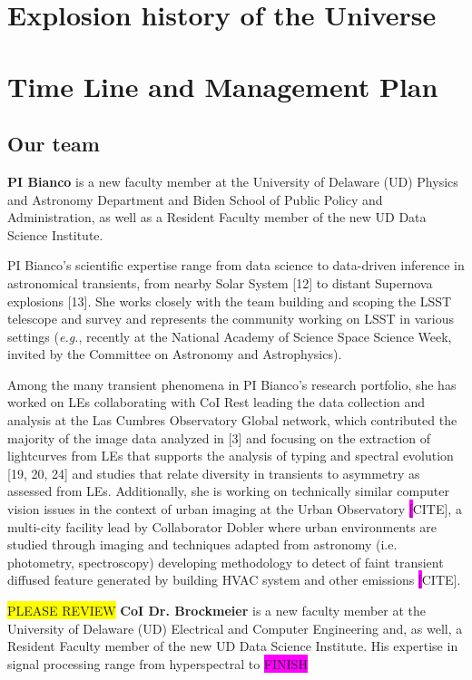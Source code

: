 \documentclass{proposalnsf}
\newcommand{\austin}[1]{\colorbox{yellow}{#1}}
\newcommand{\changeit}[1]{\colorbox{magenta}{#1}}
\newcommand{\eg}{\emph{e.g.}}
\begin{document}
\section {Explosion history of the Universe}


\section{Time Line and Management Plan}

\subsection{Our team}
{\bf PI Bianco} is a new faculty member at the University of Delaware (UD) Physics and Astronomy Department and Biden School of Public Policy and Administration,  as well as a Resident Faculty member of the new UD Data Science Institute.

PI Bianco’s scientific expertise range from data science to data-driven inference in astronomical transients, from nearby Solar System [12] to distant Supernova explosions [13].   She works closely with the team building and scoping the LSST telescope and survey and represents the community working on LSST in various settings (\eg,  recently at the National Academy of Science Space Science Week, invited by the Committee on Astronomy and Astrophysics).  

Among the many transient phenomena in PI Bianco’s research portfolio, she has worked on LEs collaborating with CoI Rest leading the data collection and analysis at the Las Cumbres Observatory Global network, which contributed the majority of the image data analyzed in [3] and focusing on the extraction of lightcurves from LEs that supports the analysis of typing and spectral evolution [19, 20, 24]
and studies that relate diversity in transients to asymmetry as assessed from LEs.  Additionally, she is working on technically similar computer vision issues in the context of urban imaging at the Urban Observatory \changeit[CITE], a multi-city facility lead by Collaborator Dobler where urban environments are studied through imaging and techniques adapted from astronomy (i.e.  photometry, spectroscopy) developing methodology to detect of faint transient diffused feature generated by building HVAC system and other emissions \changeit[CITE].

\austin{PLEASE REVIEW}
{\bf CoI Dr. Brockmeier} is a new faculty member at the University of Delaware (UD) Electrical and Computer Engineering and, as well, a Resident Faculty member of the new UD Data Science Institute.  His expertise in signal processing range from hyperspectral to \changeit{FINISH}
\end{document}
